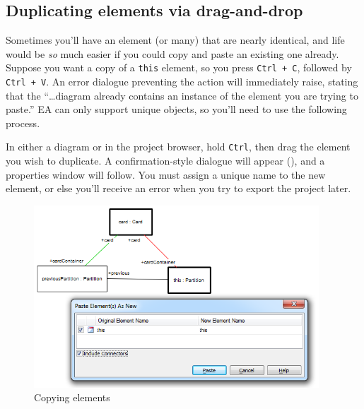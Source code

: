 \newpage

\subsection{Duplicating elements via drag-and-drop}

Sometimes you'll have an element (or many) that are nearly identical, and life would be \emph{so} much easier if you could copy and paste an existing one
already. Suppose you want a copy of a \texttt{this} element, so you press \texttt{Ctrl + C}, followed by \texttt{Ctrl + V}. An error dialogue preventing the
action will immediately raise, stating that the ``\ldots diagram already contains an instance of the element you are trying to paste.'' EA can only support
unique objects, so you'll need to use the following process.

\begin{stepbystep}

\item In either a diagram or in the project browser, hold \texttt{Ctrl}, then drag the element you wish to duplicate. A
confirmation-style dialogue will appear (), and a properties window will follow. You must assign a unique name to the new element, or
else you'll receive an error when you try to export the project later.

\vspace{0.5cm}

\begin{figure}[htbp]
\begin{center}
  \includegraphics[width=0.95\textwidth]{../../org.moflon.doc.handbook.05_miscellaneous/1_grokkingEA/06_duplicating/ea_duplicatingElements}
  \caption{Copying elements}  
  \label{ea:dupWindow}
\end{center}
\end{figure}

\end{stepbystep}
